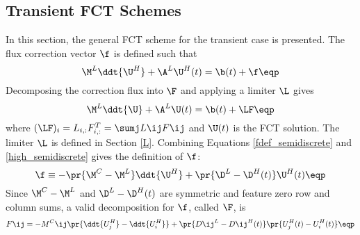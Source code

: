 \subsection{Transient FCT Schemes}
In this section, the general FCT scheme for the transient case is presented.
The flux correction vector $\f$ is defined such that
\begin{equation}\label{fdef_semidiscrete}
   \M^L\ddt{\U^{H}} + \A^L\U^H(t) = \b(t) + \f \eqp
\end{equation}
Decomposing the correction flux into $\F$ and applying a limiter $\L$ gives
\begin{equation}\label{limited_semidiscrete}
   \M^L\ddt{\U} + \A^L\U(t) = \b(t) + \LF \eqp
\end{equation}
where $(\LF)_i = L_{i,:}F_{i,:}^T = \sumj L\ij F\ij$
and $\U(t)$ is the FCT solution. The limiter $\L$ is
defined in Section \ref{L}.
Combining Equations \eqref{fdef_semidiscrete} and \eqref{high_semidiscrete}
gives the definition of $\f$:
\begin{equation}\label{f_semidiscrete}
   \f \equiv -\pr{\M^C-\M^L}\ddt{\U^H} + \pr{\D^L-\D^H(t)}\U^H(t) \eqp
\end{equation}
Since $\M^C-\M^L$ and $\D^L-\D^H(t)$ are symmetric
and feature zero row and column sums, a valid decomposition for $\f$,
called $\F$, is
\begin{equation}
   F\ij = -M^C\ij\pr{\ddt{U_j^H} - \ddt{U_i^H}}
   + \pr{D\ij^L-D\ij^H(t)}\pr{U_j^H(t) - U_i^H(t)} \eqp
\end{equation}
